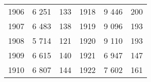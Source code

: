 \documentclass[leqno]{article}  %
\begin{document}
\begin{table}[!h]
{\begin{tabular}{p{}|p{}|p{}||p{}|p{}|p{}}
1906 & \hfill 6 251 \hspace*{2.5mm} & \hfill 133 \hspace*{2.5mm} & 1918 & \hfill 9 446 \hspace*{2.5mm} & \hfill 200 \hspace*{2.5mm} \\
1907 & \hfill 6 483 \hspace*{2.5mm} & \hfill 138 \hspace*{2.5mm} & 1919 & \hfill 9 096 \hspace*{2.5mm} & \hfill 193 \hspace*{2.5mm} \\
1908 & \hfill 5 714 \hspace*{2.5mm} & \hfill 121 \hspace*{2.5mm} & 1920 & \hfill 9 110 \hspace*{2.5mm} & \hfill 193 \hspace*{2.5mm} \\
1909 & \hfill 6 615 \hspace*{2.5mm} & \hfill 140 \hspace*{2.5mm} & 1921 & \hfill 6 947 \hspace*{2.5mm} & \hfill 147 \hspace*{2.5mm} \\
1910 & \hfill 6 807 \hspace*{2.5mm} & \hfill 144 \hspace*{2.5mm} & 1922 & \hfill 7 602 \hspace*{2.5mm} & \hfill 161 \hspace*{2.5mm} \\
\hline
\end{tabular}
}
\end{table}




\end{document}
